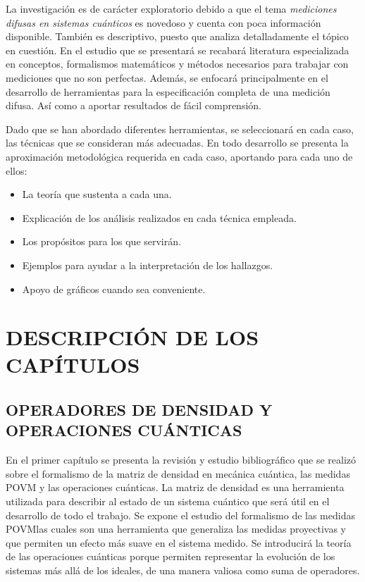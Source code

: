 \documentclass[12pt,oneside]{book}\raggedbottom{} %
\begin{document}
\begin{sloppypar}
{{La investigación es de carácter exploratorio debido a que el tema \textit{mediciones difusas en sistemas cuánticos} es novedoso y  cuenta con poca información disponible. También es descriptivo, puesto que analiza detalladamente el tópico en cuestión. En el estudio que se presentará se recabará literatura especializada en conceptos, formalismos matemáticos y métodos necesarios para trabajar con mediciones que no son perfectas. Además, se enfocará principalmente en el desarrollo de herramientas para la especificación completa de una medición difusa. Así como a aportar resultados de fácil comprensión.


  Dado que se han abordado diferentes herramientas, se seleccionará en cada caso, las técnicas que se consideran más adecuadas. En todo desarrollo se presenta la aproximación metodológica requerida en cada caso, aportando para cada uno de ellos:

\begin{itemize}
  \item La teoría que sustenta a cada una.
  \item Explicación de los análisis realizados en cada técnica empleada.
  \item Los propósitos para los que servirán.
  \item Ejemplos para ayudar a la interpretación de los hallazgos.
  \item Apoyo de gráficos cuando sea conveniente.
\end{itemize}






\chapter{DESCRIPCIÓN DE LOS CAPÍTULOS}  %
\section{OPERADORES DE DENSIDAD Y OPERACIONES CUÁNTICAS}
En el primer capítulo  se presenta la revisión y estudio bibliográfico que se
realizó sobre el formalismo de la matriz de densidad en mecánica cuántica, las
medidas POVM y las operaciones cuánticas. La matriz de densidad es una
herramienta utilizada para describir al estado de un sistema cuántico que será
útil en el desarrollo de todo el trabajo.  Se expone el estudio del formalismo
de las medidas POVM\@ las cuales son una herramienta que generaliza las medidas
proyectivas y que permiten un efecto más suave en el sistema medido.  Se
introducirá la teoría de las operaciones cuánticas  porque permiten representar
la evolución de los sistemas más allá de los ideales, de una manera valiosa
como suma de operadores.

}}
\end{sloppypar}
\end{document}
